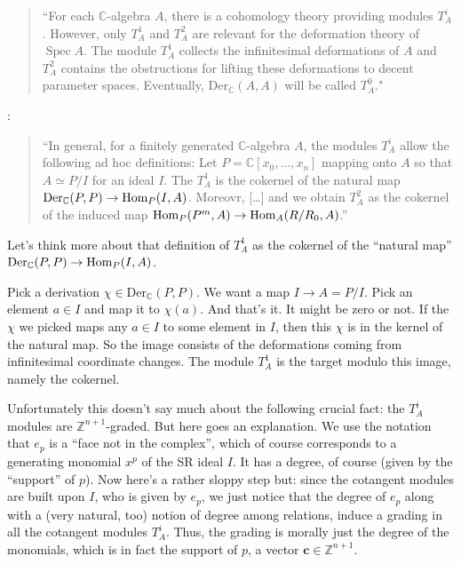 \begin{quotation}
  ``For each $\mathbb{C}$-algebra $A$,
there is a cohomology theory providing
modules $T^i_A$.
However, only $T^1_A$ and $T^2_A$ are
relevant for the deformation
theory of $\operatorname{Spec} A$. The module $T^1_A$
collects the infinitesimal
deformations of $A$ and $T^2_A$ contains the
obstructions
for lifting these deformations to decent
parameter spaces.
Eventually, $\text{Der}_{\mathbb{C}}(A,A)$
will be called $T_A^0$."
\end{quotation}

\cite[p. 3]{jan3}:
\begin{quotation}
``In general, for a finitely generated
$\mathbb{C}$-algebra $A$,
the modules $T_A^i$ allow the following ad
hoc definitions:
Let $P=\mathbb{C}[x_0,…,x_n]$ mapping onto
$A$ so that $A \simeq P/I$
for an ideal $I$. The $T_A^1$ is the cokernel
of the natural map
$\text{Der}_\mathbb{C}(P,P) \to \mathop{\mathrm{Hom}}\nolimits_P(I,A)$.
Moreovr, […] and we obtain $T^2_A$ as the
cokernel
of the induced map
$\mathop{\mathrm{Hom}}\nolimits_P(P^m,A)\to\mathop{\mathrm{Hom}}\nolimits_A(R/R_0,A)$.''
\end{quotation}

\begin{remark}[dani]
\label{remark-dani1}
Let's think more about that definition of
$T^1_A$
as the cokernel of the ``natural map''
$\text{Der}_\mathbb{C}(P,P) \to \mathop{\mathrm{Hom}}\nolimits_P(I,A)$.

Pick a derivation $\chi \in
\text{Der}_\mathbb{C}(P,P)$.
We want a map $I \to A=P/I$.
Pick an element $a \in I$ and map it to
$\chi(a)$.
And that's it. It might be zero or not.
If the $\chi$ we picked maps any $a \in I$ to
some element in $I$,
then this $\chi$ is in the kernel of the
natural map.
So the image consists of the deformations
coming from infinitesimal coordinate
changes. The module $T^1_A$ is the target
modulo this image, namely the cokernel.
\end{remark}

\noindent
Unfortunately this doesn't say much about the
following crucial fact:
the $T^i_A$ modules are
$\mathbb{Z}^{n+1}$-graded.
But here goes an explanation.
We use the notation that $e_p$ is a ``face
not in the complex'',
which of course corresponds to a generating
monomial $x^p$
of the SR ideal $I$.
It has a degree, of course (given by the
``support'' of $p$).
Now here's a rather sloppy step but:
since the cotangent modules are built upon
$I$,
who is given by $e_p$,
we just notice that the degree of $e_p$
along with a (very natural, too) notion of
degree among relations,
induce a grading in all the cotangent modules
$T_A^i$.
Thus, the grading is morally just the degree
of the monomials,
which is in fact the support of $p$, a vector
$\mathbf{c} \in \mathbb{Z}^{n+1}$.

